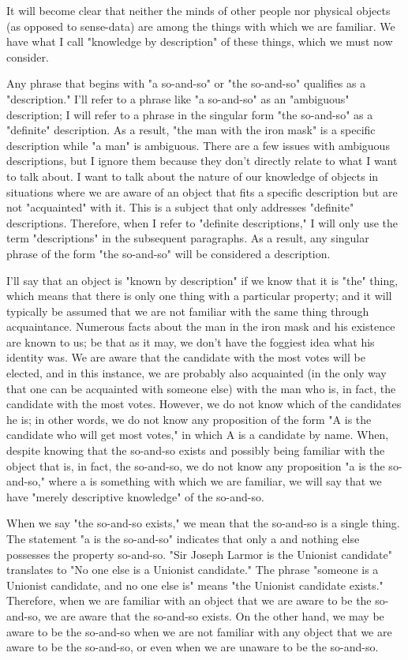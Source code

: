 \documentclass[a4paper,12pt]{book}[2004/02/16]
\theoremstyle{ilemma}
\theoremstyle{itheorem}
\theoremstyle{iother}
\theoremstyle{icorollary}
\theoremstyle{numcorollary}
\theoremstyle{idefinition}
\begin{document}
It will become clear that neither the minds of other people nor physical objects (as opposed to sense-data) are among the things with which we are familiar. We have what I call "knowledge by description" of these things, which we must now consider.

Any phrase that begins with "a so-and-so" or "the so-and-so" qualifies as a "description." I'll refer to a phrase like "a so-and-so" as an "ambiguous" description; I will refer to a phrase in the singular form "the so-and-so" as a "definite" description. As a result, "the man with the iron mask" is a specific description while "a man" is ambiguous. There are a few issues with ambiguous descriptions, but I ignore them because they don't directly relate to what I want to talk about. I want to talk about the nature of our knowledge of objects in situations where we are aware of an object that fits a specific description but are not "acquainted" with it. This is a subject that only addresses "definite" descriptions. Therefore, when I refer to "definite descriptions," I will only use the term "descriptions" in the subsequent paragraphs. As a result, any singular phrase of the form "the so-and-so" will be considered a description.

I'll say that an object is "known by description" if we know that it is "the" thing, which means that there is only one thing with a particular property; and it will typically be assumed that we are not familiar with the same thing through acquaintance. Numerous facts about the man in the iron mask and his existence are known to us; be that as it may, we don't have the foggiest idea what his identity was.
We are aware that the candidate with the most votes will be elected, and in this instance, we are probably also acquainted (in the only way that one can be acquainted with someone else) with the man who is, in fact, the candidate with the most votes. However, we do not know which of the candidates he is; in other words, we do not know any proposition of the form "A is the candidate who will get most votes," in which A is a candidate by name. When, despite knowing that the so-and-so exists and possibly being familiar with the object that is, in fact, the so-and-so, we do not know any proposition "a is the so-and-so," where a is something with which we are familiar, we will say that we have "merely descriptive knowledge" of the so-and-so.

When we say "the so-and-so exists," we mean that the so-and-so is a single thing. The statement "a is the so-and-so" indicates that only a and nothing else possesses the property so-and-so. "Sir Joseph Larmor is the Unionist candidate" translates to "No one else is a Unionist candidate." The phrase "someone is a Unionist candidate, and no one else is" means "the Unionist candidate exists."
Therefore, when we are familiar with an object that we are aware to be the so-and-so, we are aware that the so-and-so exists. On the other hand, we may be aware to be the so-and-so when we are not familiar with any object that we are aware to be the so-and-so, or even when we are unaware to be the so-and-so.
\end{document}
